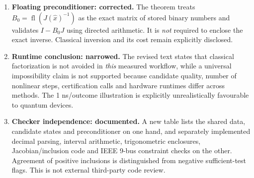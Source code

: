\documentclass[11pt,a4paper]{article}
\begin{document}
\begin{enumerate}
\item \textbf{Floating preconditioner: corrected.} The theorem treats $B_0=\operatorname{fl}(J(\widehat x)^{-1})$ as the exact matrix of stored binary numbers and validates $I-B_0J$ using directed arithmetic. It is \emph{not} required to enclose the exact inverse. Classical inversion and its cost remain explicitly disclosed.

\item \textbf{Runtime conclusion: narrowed.} The revised text states that classical factorization is not avoided in \emph{this} measured workflow, while a universal impossibility claim is not supported because candidate quality, number of nonlinear steps, certification calls and hardware runtimes differ across methods. The 1 ns/outcome illustration is explicitly unrealistically favourable to quantum devices.

\item \textbf{Checker independence: documented.} A new table lists the shared data, candidate states and preconditioner on one hand, and separately implemented decimal parsing, interval arithmetic, trigonometric enclosures, Jacobian/inclusion code and IEEE 9-bus constraint checks on the other. Agreement of positive inclusions is distinguished from negative sufficient-test flags. This is not external third-party code review.
\end{enumerate}
\end{document}
